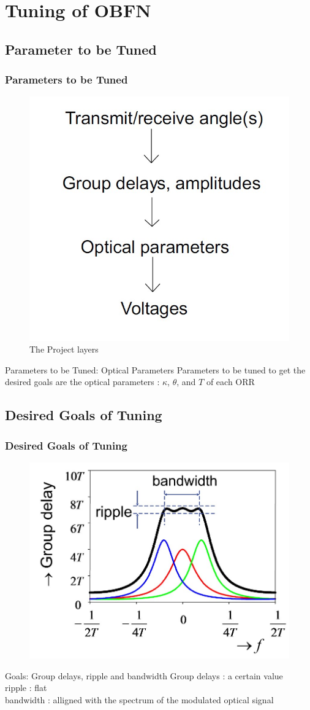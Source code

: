 \documentclass{beamer}
\begin{document}
\section{Tuning of OBFN}

\subsection{Parameter to be Tuned}

\begin{frame}\frametitle{Parameters to be Tuned}

	\begin{figure}
			\centering
			\includegraphics[width=0.35\linewidth]{images/project_layer}
			\caption{The Project layers}
			\label{fig:projlayers}
	\end{figure}
	\begin{alertblock}{Parameters to be Tuned: Optical Parameters}
		Parameters to be tuned to get the desired goals are the optical parameters : $\kappa$, $\theta$, and $T$ of each ORR\\
	\end{alertblock}
\end{frame}

\subsection{Desired Goals of Tuning}

\begin{frame}\frametitle{Desired Goals of Tuning}
	\begin{figure}
			\centering
			\includegraphics[width=0.45\linewidth]{images/ORR2}
			\label{fig:projlayers}
	\end{figure}
	\begin{alertblock}{Goals: Group delays, ripple and bandwidth}
		Group delays : a certain value\\
		ripple : flat\\
		bandwidth : alligned with the spectrum of the modulated optical signal
	\end{alertblock}
\end{frame}
\end{document}
